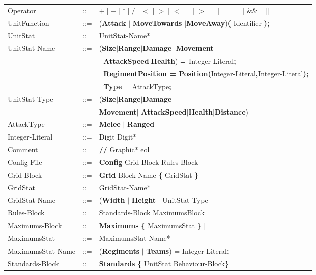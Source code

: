 \begin{center}
\begin{longtable}{ l l l }
				Operator			&	::=	&$\boldsymbol {+} \mid \boldsymbol {-} \mid  \boldsymbol {*}\mid 
									\boldsymbol {/} \mid \boldsymbol {<} \mid  \boldsymbol {>} \mid
									\boldsymbol {<=} \mid  \boldsymbol {>=} \mid \boldsymbol {==} 
									\mid \boldsymbol {\&\&} \mid \boldsymbol {\|}$\\
				UnitFunction		&	::=	&({\bf Attack} $\mid$ {\bf MoveTowards} $\mid${\bf MoveAway}){\bf (} Identifier {\bf );}\\
				UnitStat			&	::=	&UnitStat-Name*\\
				UnitStat-Name		&	::=	&({\bf Size}$\mid${\bf Range}$\mid${\bf Damage} $\mid${\bf Movement}\\ 
									&		&$\mid$ {\bf AttackSpeed}$\mid${\bf Health}) ${\bf = }$ Integer-Literal{\bf ;} \\
									&		&$\mid$ {\bf RegimentPosition = Position(}Integer-Literal{\bf ,}Integer-Literal{\bf );}\\
									&		&$\mid$ {\bf Type} = AttackType{\bf ;}\\
				UnitStat-Type		&	::=	&({\bf Size}$\mid${\bf Range}$\mid${\bf Damage} $\mid$\\
									&		&{\bf Movement}$\mid$ {\bf AttackSpeed}$\mid${\bf Health}$\mid${\bf Distance})\\ 
				AttackType			&	::=	&{\bf Melee} $\mid$ {\bf Ranged} \\
				Integer-Literal		&	::=	&Digit Digit*\\
				Comment				&	::=	&{\bf //} Graphic* eol\\
				Config-File			&	::=	&{\bf Config} Grid-Block Rules-Block  		\\
				Grid-Block			&	::=	&{\bf Grid} Block-Name	 {\bf \{} GridStat \bf{\}} \\
				GridStat			&	::=	&GridStat-Name*\\	
				GridStat-Name		&	::=	&({\bf Width} $\mid$ {\bf Height} $\mid$ UnitStat-Type\\	
				Rules-Block			&	::=	&Standards-Block MaximumsBlock 				\\
				Maximums-Block		&	::=	&{\bf Maximums} {\bf \{} MaximumsStat {\bf \}} $\mid$ \\
				MaximumsStat		&	::=	&MaximumsStat-Name*\\
				MaximumsStat-Name	&	::=	&({\bf Regiments }$\mid$ {\bf Teams}) =  Integer-Literal{\bf ;}\\		 
				Standards-Block		&	::=	&{\bf Standards} {\bf \{ } UnitStat Behaviour-Block\bf{\} }		\\
			\end{longtable}
		\end{center}					     